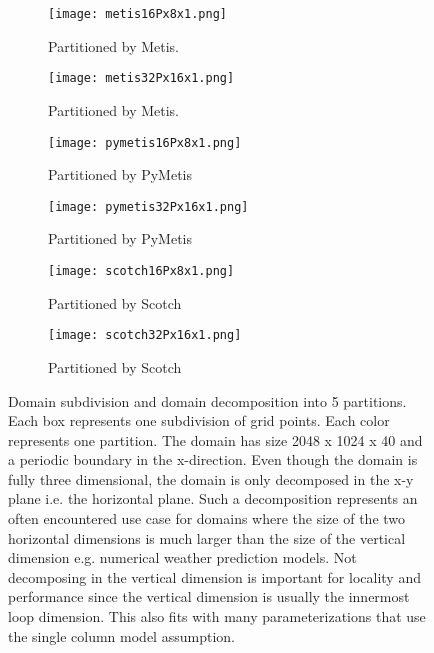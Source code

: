 \begin{figure}[!htbp]
\centering
\begin{subfigure}{0.5\textwidth}
  \centering
  \texttt{[image: metis16Px8x1.png]}
  \caption{Partitioned by Metis.}
  \label{fig:metis1}
\end{subfigure}%
\begin{subfigure}{0.5\textwidth}
  \centering
  \texttt{[image: metis32Px16x1.png]}
  \caption{Partitioned by Metis.}
  \label{fig:metis2}
\end{subfigure}

\begin{subfigure}{0.5\textwidth}
  \centering
  \texttt{[image: pymetis16Px8x1.png]}
  \caption{Partitioned by PyMetis}
  \label{fig:pymetis1}
\end{subfigure}%
\begin{subfigure}{0.5\textwidth}
  \centering
  \texttt{[image: pymetis32Px16x1.png]}
  \caption{Partitioned by PyMetis}
  \label{fig:pymetis2}
\end{subfigure}

\begin{subfigure}{0.5\textwidth}
  \centering
  \texttt{[image: scotch16Px8x1.png]}
  \caption{Partitioned by Scotch}
  \label{fig:scotch1}
\end{subfigure}%
\begin{subfigure}{0.5\textwidth}
  \centering
  \texttt{[image: scotch32Px16x1.png]}
  \caption{Partitioned by Scotch}
  \label{fig:scotch2}
\end{subfigure}

\caption{Domain subdivision and domain decomposition into 5 partitions. 
Each box represents one subdivision of grid points.
Each color represents one partition. 
The domain has size 2048 x 1024 x 40 and a periodic boundary in the x-direction.
Even though the domain is fully three dimensional, the domain is only decomposed in the x-y plane i.e. the horizontal plane.
Such a decomposition represents an often encountered use case for domains where the size of the two horizontal dimensions is much larger than the size of the vertical dimension e.g. numerical weather prediction models.
Not decomposing in the vertical dimension is important for locality and performance since the vertical dimension is usually the innermost loop dimension.
This also fits with many parameterizations that use the single column model assumption.
}
\label{fig:rectangular1}
\end{figure}


